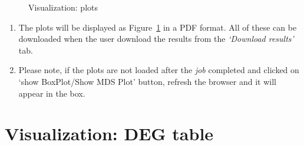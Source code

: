 \documentclass[
  a4paper,
  DIV=11,
  numbers=noendperiod,
  oneside,
  open=any]{scrreport}
\providecommand{\tightlist}{%
  \setlength{\itemsep}{0pt}\setlength{\parskip}{0pt}}\usepackage{longtable,booktabs,array}
\begin{document}
\begin{figure}[H]


\caption{\label{fig-trans7}Visualization: plots}

\end{figure}%

\begin{tcolorbox}[enhanced jigsaw, coltitle=black, colback=white, title=\textcolor{quarto-callout-note-color}{\faInfo}\hspace{0.5em}{Note}, leftrule=.75mm, titlerule=0mm, colframe=quarto-callout-note-color-frame, toprule=.15mm, opacityback=0, arc=.35mm, breakable, rightrule=.15mm, colbacktitle=quarto-callout-note-color!10!white, bottomtitle=1mm, opacitybacktitle=0.6, left=2mm, bottomrule=.15mm, toptitle=1mm]

\begin{enumerate}
\def\labelenumi{\arabic{enumi}.}
\tightlist
\item
  The plots will be displayed as Figure~\ref{fig-trans7} in a PDF
  format. All of these can be downloaded when the user download the
  results from the \emph{`Download results'} tab.
\item
  Please note, if the plots are not loaded after the \emph{job}
  completed and clicked on `show BoxPlot/Show MDS Plot' button, refresh
  the browser and it will appear in the box.
\end{enumerate}

\end{tcolorbox}

\section{Visualization: DEG table}\label{visualization-deg-table}
\end{document}
